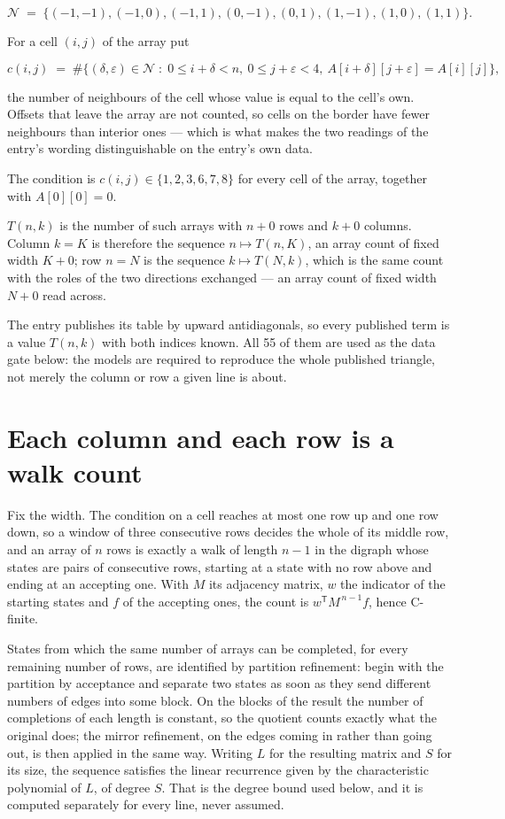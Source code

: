 \documentclass[11pt]{article}
\theoremstyle{definition}
\begin{document}
\[\mathcal{N} \;=\; \{(-1,-1), (-1,0), (-1,1), (0,-1), (0,1), (1,-1), (1,0), (1,1)\}.\]

For a cell $(i,j)$ of the array put

\[c(i,j) \;=\; \#\bigl\{(\delta,\varepsilon)\in\mathcal{N} \;:\; 0\le i+\delta<n,\ 0\le j+\varepsilon<4,\ A[i+\delta][j+\varepsilon] = A[i][j]\bigr\},\]

the number of neighbours of the cell whose value is equal to the cell's own. Offsets that leave the array are not counted, so cells on the border have fewer neighbours than interior ones --- which is what makes the two readings of the entry's wording distinguishable on the entry's own data.

The condition is $c(i,j) \in \{1, 2, 3, 6, 7, 8\}$ for every cell of the array, together with $A[0][0]=0$.

$T(n,k)$ is the number of such arrays with $n + 0$ rows and $k + 0$ columns. Column $k = K$ is therefore the sequence $n \mapsto T(n,K)$, an array count of fixed width $K + 0$; row $n = N$ is the sequence $k \mapsto T(N,k)$, which is the same count with the roles of the two directions exchanged --- an array count of fixed width $N + 0$ read across.

The entry publishes its table by upward antidiagonals, so every published term is a value $T(n,k)$ with both indices known. All 55 of them are used as the data gate below: the models are required to reproduce the whole published triangle, not merely the column or row a given line is about.

\section{Each column and each row is a walk count}

Fix the width. The condition on a cell reaches at most one row up and one row down, so a window of three consecutive rows decides the whole of its middle row, and an array of $n$ rows is exactly a walk of length $n-1$ in the digraph whose states are pairs of consecutive rows, starting at a state with no row above and ending at an accepting one. With $M$ its adjacency matrix, $w$ the indicator of the starting states and $f$ of the accepting ones, the count is $w^{\mathsf T}M^{\,n-1}f$, hence C-finite.

States from which the same number of arrays can be completed, for every remaining number of rows, are identified by partition refinement: begin with the partition by acceptance and separate two states as soon as they send different numbers of edges into some block. On the blocks of the result the number of completions of each length is constant, so the quotient counts exactly what the original does; the mirror refinement, on the edges coming in rather than going out, is then applied in the same way. Writing $L$ for the resulting matrix and $S$ for its size, the sequence satisfies the linear recurrence given by the characteristic polynomial of $L$, of degree $S$. That is the degree bound used below, and it is computed separately for every line, never assumed.
\end{document}
